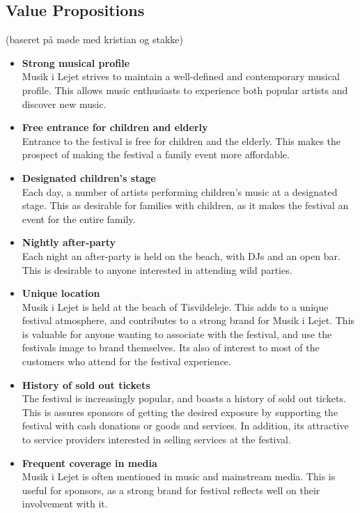 \subsection{Value Propositions} %
\label{sub:value_propositions}
(baseret på møde med kristian og stakke)
\begin{itemize}
	\item \textbf{Strong musical profile}\\
	 Musik i Lejet strives to maintain a well-defined and contemporary musical profile. This allows music enthusiasts to experience both popular artists and discover new music.
	\item \textbf{Free entrance for children and elderly}\\
	Entrance to the festival is free for children and the elderly. This makes the prospect of making the festival a family event more affordable.
	\item \textbf{Designated children's stage}\\
	Each day, a number of artists performing children's music at a designated stage. This as desirable for families with children, as it makes the festival an event for the entire family.
	\item \textbf{Nightly after-party}\\
	Each night an after-party is held on the beach, with DJs and an open bar. This is desirable to anyone interested in attending wild parties.
	\item \textbf{Unique location}\\
	Musik i Lejet is held at the beach of Tisvildeleje. This adds to a unique festival atmosphere, and contributes to a strong brand for Musik i Lejet. This is valuable for anyone wanting to associate with the festival, and use the festivals image to brand themselves. Its also of interest to most of the customers who attend for the festival experience.
	\item \textbf{History of sold out tickets}\\
	The festival is increasingly popular, and boasts a history of sold out tickets. This is assures sponsors of getting the desired exposure by supporting the festival with cash donations or goods and services. In addition, its attractive to service providers interested in selling services at the festival.
	\item \textbf{Frequent coverage in media}\\
	Musik i Lejet is often mentioned in music and mainstream media. This is useful for sponsors, as a strong brand for festival reflects well on their involvement with it.
\end{itemize}
